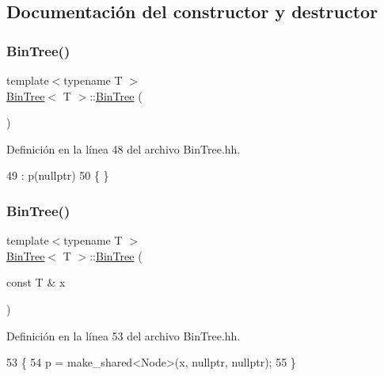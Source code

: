 \subsection{Documentación del constructor y destructor}
\mbox{\label{class_bin_tree_a47eef22d29cd023449d97c073c08e5b6}} 
\subsubsection{\texorpdfstring{Bin\+Tree()}{BinTree()}\hspace{0.1cm}{\footnotesize\ttfamily [1/3]}}
{\footnotesize\ttfamily template$<$typename T $>$ \\
\mbox{\hyperlink{class_bin_tree}{Bin\+Tree}}$<$ T $>$\+::\mbox{\hyperlink{class_bin_tree}{Bin\+Tree}} (\begin{DoxyParamCaption}{ }\end{DoxyParamCaption})}



Definición en la línea 48 del archivo Bin\+Tree.\+hh.


\begin{DoxyCode}
49     :   p(\textcolor{keyword}{nullptr})
50     \{   \}
\end{DoxyCode}
\mbox{\label{class_bin_tree_a1ab686e0bcf990093ff91fe71744c1a4}} 
\subsubsection{\texorpdfstring{Bin\+Tree()}{BinTree()}\hspace{0.1cm}{\footnotesize\ttfamily [2/3]}}
{\footnotesize\ttfamily template$<$typename T $>$ \\
\mbox{\hyperlink{class_bin_tree}{Bin\+Tree}}$<$ T $>$\+::\mbox{\hyperlink{class_bin_tree}{Bin\+Tree}} (\begin{DoxyParamCaption}\item[{const T \&}]{x }\end{DoxyParamCaption})\hspace{0.3cm}{\ttfamily [explicit]}}



Definición en la línea 53 del archivo Bin\+Tree.\+hh.


\begin{DoxyCode}
53                                   \{
54         p = make\_shared<Node>(x, \textcolor{keyword}{nullptr}, \textcolor{keyword}{nullptr});
55     \}
\end{DoxyCode}
\mbox{\label{class_bin_tree_adb7eeff76d08130c943b36af215eb521}} 
